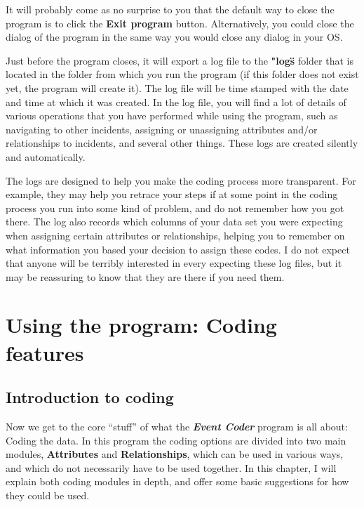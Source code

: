 \documentclass{memoir}
\begin{document}
It will probably come as no surprise to you that the default way to close the program is to click the \textbf{Exit program} button. Alternatively, you could close the dialog of the program in the same way you would close any dialog in your OS.

Just before the program closes, it will export a log file to the \textbf{"logs\"} folder that is located in the folder from which you run the program (if this folder does not exist yet, the program will create it). The log file will be time stamped with the date and time at which it was created. In the log file, you will find a lot of details of various operations that you have performed while using the program, such as navigating to other incidents, assigning or unassigning attributes and/or relationships to incidents, and several other things. These logs are created silently and automatically.

The logs are designed to help you make the coding process more transparent. For example, they may help you retrace your steps if at some point in the coding process you run into some kind of problem, and do not remember how you got there. The log also records which columns of your data set you were expecting when assigning certain attributes or relationships, helping you to remember on what information you based your decision to assign these codes. I do not expect that anyone will be terribly interested in every expecting these log files, but it may be reassuring to know that they are there if you need them.  


\chapter{Using the program: Coding features}
\label{chap:usingtheprogram2}

\section{Introduction to coding}
\label{sec:introductiontocoding}

Now we get to the core ``stuff'' of what the \textbf{\emph{Event Coder}} program is all about: Coding the data. In this program the coding options are divided into two main modules, \textbf{Attributes} and \textbf{Relationships}, which can be used in various ways, and which do not necessarily have to be used together. In this chapter, I will explain both coding modules in depth, and offer some basic suggestions for how they could be used.
\end{document}
